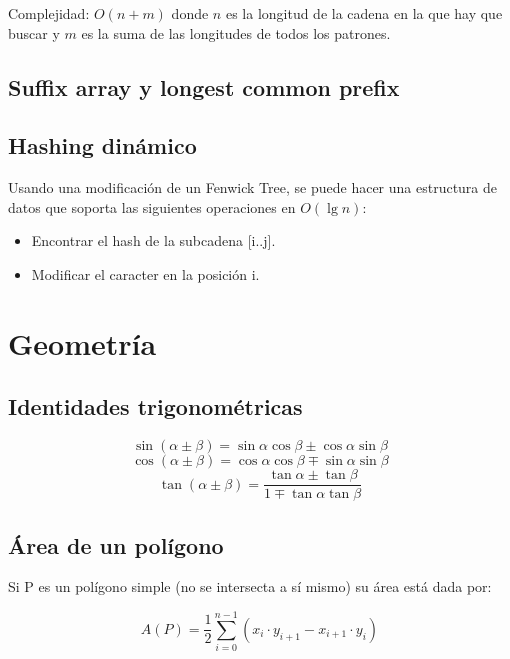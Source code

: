 \documentclass[10pt,letterpaper,twocolumn]{article}
\newcommand{\codigofuente}[1]{

\dotfill
}
\begin{document}
\smallskip

Complejidad: $O(n + m)$ donde $n$ es la longitud de la cadena en la que hay que buscar
y $m$ es la suma de las longitudes de todos los patrones.

\smallskip

\codigofuente{./src/strings/aho-corasick.cpp}
\subsection{Suffix array y longest common prefix}
\codigofuente{./src/strings/suffix_array.cpp}

\subsection{Hashing dinámico}

Usando una modificación de un Fenwick Tree, se puede hacer una estructura de datos que soporta
las siguientes operaciones en $O(\lg n)$:

\begin{itemize}
    \item Encontrar el hash de la subcadena [i..j].
    \item Modificar el caracter en la posición i.
\end{itemize}

\codigofuente{./src/strings/dynamic_hashing.cpp}

\section{Geometría}

\subsection{Identidades trigonométricas}

$$ \sin(\alpha \pm \beta) = \sin \alpha \cos \beta \pm \cos \alpha \sin \beta $$
$$ \cos(\alpha \pm \beta) = \cos \alpha \cos \beta \mp \sin \alpha \sin \beta $$
$$ \tan(\alpha \pm \beta) = \frac{\tan \alpha \pm \tan \beta}{1 \mp \tan \alpha \tan \beta} $$


\subsection{Área de un polígono}
Si P es un polígono simple (no se intersecta a sí mismo) su área está dada por:

$$ A(P) = \frac{1}{2} \displaystyle\sum_{i=0}^{n-1} (x_{i} \cdot y_{i+1} - x_{i+1} \cdot y_{i}) $$
\end{document}
